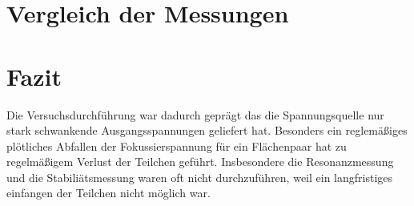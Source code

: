\documentclass[a4paper,12pt]{article}
\begin{document}
\section{Vergleich der Messungen}

\section{Fazit}
Die Versuchsdurchführung war dadurch geprägt das die Spannungsquelle nur stark schwankende Ausgangsspannungen geliefert hat. Besonders ein reglemäßiges plötliches Abfallen der Fokussierspannung für ein 
Flächenpaar hat zu regelmäßigem Verlust der Teilchen geführt. Insbesondere die Resonanzmessung und die Stabiliätsmessung waren oft nicht durchzuführen, weil ein langfristiges einfangen der Teilchen nicht
möglich war.

\end{document}
